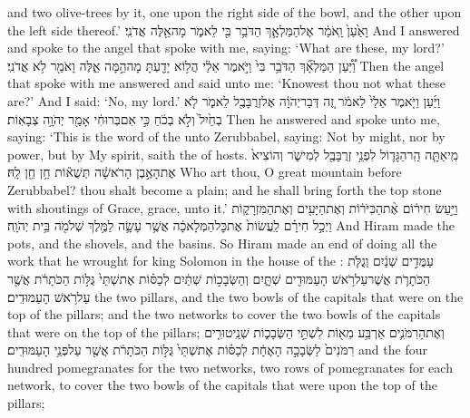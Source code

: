 \documentclass[11pt, openany]{book}
\begin{document}
{and two olive-trees by it, one upon the right side of the bowl, and the other upon the left side thereof.’}
{וָאַ֙עַן֙ וָֽאֹמַ֔ר אֶל\maqqaf הַמַּלְאָ֛ךְ הַדֹּבֵ֥ר בִּ֖י לֵאמֹ֑ר מָה\maqqaf אֵ֖לֶּה אֲדֹנִֽי׃}
{And I answered and spoke to the angel that spoke with me, saying: ‘What are these, my lord?’}
{וַ֠יַּ֠עַן הַמַּלְאָ֞ךְ הַדֹּבֵ֥ר בִּי֙ וַיֹּ֣אמֶר אֵלַ֔י הֲל֥וֹא יָדַ֖עְתָּ מָה\maqqaf הֵ֣מָּה אֵ֑לֶּה וָאֹמַ֖ר לֹ֥א אֲדֹנִֽי׃}
{Then the angel that spoke with me answered and said unto me: ‘Knowest thou not what these are?’ And I said: ‘No, my lord.’}
{וַיַּ֜עַן וַיֹּ֤אמֶר אֵלַי֙ לֵאמֹ֔ר זֶ֚ה דְּבַר\maqqaf יְהֹוָ֔ה אֶל\maqqaf זְרֻבָּבֶ֖ל לֵאמֹ֑ר לֹ֤א בְחַ֙יִל֙ וְלֹ֣א בְכֹ֔חַ כִּ֣י אִם\maqqaf בְּרוּחִ֔י אָמַ֖ר יְהֹוָ֥ה צְבָאֽוֹת׃}
{Then he answered and spoke unto me, saying: ‘This is the word of the \lord\space unto Zerubbabel, saying: Not by might, nor by power, but by My spirit, saith the \lord\space of hosts.}
{מִֽי\maqqaf אַתָּ֧ה הַֽר\maqqaf הַגָּד֛וֹל לִפְנֵ֥י זְרֻבָּבֶ֖ל לְמִישֹׁ֑ר וְהוֹצִיא֙ אֶת\maqqaf הָאֶ֣בֶן הָרֹאשָׁ֔ה תְּשֻׁא֕וֹת חֵ֥ן חֵ֖ן לָֽהּ׃ \petucha }
{Who art thou, O great mountain before Zerubbabel? thou shalt become a plain; and he shall bring forth the top stone with shoutings of Grace, grace, unto it.’}
\newperek
{}
\label{haft_hanukka2}
\setcounter{chap}{7}
\setcounter{verse}{40}
{וַיַּ֣עַשׂ חִיר֔וֹם אֶ֨ת\maqqaf הַכִּיֹּר֔וֹת וְאֶת\maqqaf הַיָּעִ֖ים וְאֶת\maqqaf הַמִּזְרָק֑וֹת וַיְכַ֣ל חִירָ֗ם לַֽעֲשׂוֹת֙ אֶת\maqqaf כׇּל\maqqaf הַמְּלָאכָ֔ה אֲשֶׁ֥ר עָשָׂ֛ה לַמֶּ֥לֶךְ שְׁלֹמֹ֖ה בֵּ֥ית יְהֹוָֽה׃}
{And Hiram made the pots, and the shovels, and the basins. So Hiram made an end of doing all the work that he wrought for king Solomon in the house of the \lord:}
{עַמֻּדִ֣ים שְׁנַ֔יִם וְגֻלֹּ֧ת הַכֹּתָרֹ֛ת אֲשֶׁר\maqqaf עַל\maqqaf רֹ֥אשׁ הָעַמּוּדִ֖ים שְׁתָּ֑יִם וְהַשְּׂבָכ֣וֹת שְׁתַּ֔יִם לְכַסּ֗וֹת אֶת\maqqaf שְׁתֵּי֙ גֻּלּ֣וֹת הַכֹּתָרֹ֔ת אֲשֶׁ֖ר עַל\maqqaf רֹ֥אשׁ הָעַמּוּדִֽים׃}
{the two pillars, and the two bowls of the capitals that were on the top of the pillars; and the two networks to cover the two bowls of the capitals that were on the top of the pillars;}
{וְאֶת\maqqaf הָרִמֹּנִ֛ים אַרְבַּ֥ע מֵא֖וֹת לִשְׁתֵּ֣י הַשְּׂבָכ֑וֹת שְׁנֵֽי\maqqaf טוּרִ֤ים רִמֹּנִים֙ לַשְּׂבָכָ֣ה הָאֶחָ֔ת לְכַסּ֗וֹת אֶת\maqqaf שְׁתֵּי֙ גֻּלּ֣וֹת הַכֹּתָרֹ֔ת אֲשֶׁ֖ר עַל\maqqaf פְּנֵ֥י הָעַמּוּדִֽים׃}
{and the four hundred pomegranates for the two networks, two rows of pomegranates for each network, to cover the two bowls of the capitals that were upon the top of the pillars;}
\end{document}
